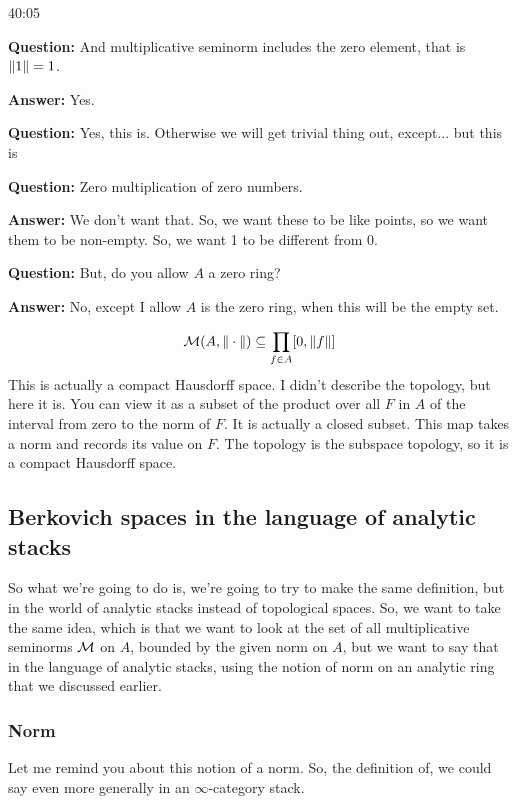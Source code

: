 \begin{example}
\begin{unfinished}{40:05}
\begin{example}
\textbf{Question:} And multiplicative seminorm includes the zero element, that is $\| 1 \| = 1$. 

\textbf{Answer:} Yes.

\textbf{Question:} Yes, this is. Otherwise we will get trivial thing out, except... but this is 

\textbf{Question:} Zero multiplication of zero numbers.

\textbf{Answer:} We don't want that. So, we want these to be like points, so we want them to be non-empty. So, we want 1 to be different from 0.

\textbf{Question:}  But, do you allow $A$ a zero ring? 

\textbf{Answer:} No, except I allow $A$ is the zero ring, when this will be the empty set.

\end{example}

\begin{align}
\mathcal{M}(A, \| \cdot \|) \subseteq \prod_{f \in A} [0, \| f \| ]
\end{align}
This is actually a compact Hausdorff space. I didn't describe the topology, but here it is. You can view it as a subset of the product over all $F$ in $A$ of the interval from zero to the norm of $F$. It is actually a closed subset. This map takes a norm and records its value on $F$. The topology is the subspace topology, so it is a compact Hausdorff space.

\subsection{Berkovich spaces in the language of analytic stacks} \label{subsec:berk_spaces_language_analytic_stacks}
So what we're going to do is, we're going to try to make the same definition, but in the world of analytic stacks instead of topological spaces. So, we want to take the same idea, which is that we want to look at the set of all multiplicative seminorms $\mathcal{M}$ on $A$, bounded by the given norm on $A$, but we want to say that in the language of analytic stacks, using the notion of norm on an analytic ring that we discussed earlier.

\subsubsection{Norm} \label{subsubsec:norm_reminder}
Let me remind you about this notion of a norm. So, the definition of, we could say even more generally in an $\infty$-category stack. 


\end{unfinished}
\end{example}

